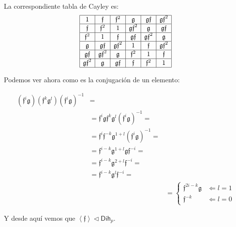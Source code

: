 \documentclass[12pt,a4paper,fleqn,spanish,final,openright]{extbook}
\theoremstyle{definition}
\theoremstyle{remark}
\begin{document}
La correspondiente tabla de Cayley es:
\begin{align*}
\begin{array}{|c|c|c|c|c|c|c|c|}
\hline
1&\mathfrak{f}&\mathfrak{f}^2&\mathfrak{g}&\mathfrak{gf}&\mathfrak{gf}^2\\
\hline
\mathfrak{f}&\mathfrak{f}^2&1&\mathfrak{gf}^2&\mathfrak{g}&\mathfrak{gf}\\
\hline
\mathfrak{f}^2&1&\mathfrak{f}&\mathfrak{gf}&\mathfrak{gf}^2&\mathfrak{g}\\
\hline
\mathfrak{g}&\mathfrak{gf}&\mathfrak{gf}^2&1&\mathfrak{f}&\mathfrak{gf}^2\\
\hline
\mathfrak{gf}&\mathfrak{gf}^2&\mathfrak{g}&\mathfrak{f}^2&1&\mathfrak{f}\\
\hline
\mathfrak{gf}^2&\mathfrak{g}&\mathfrak{gf}&\mathfrak{f}&\mathfrak{f}^2&1\\
\hline
\end{array}
\end{align*}

Podemos ver ahora como es la conjugación de un elemento:

\begin{align}
(\mathfrak{f}^i\mathfrak{g})(\mathfrak{f}^k\mathfrak{g}^l)(\mathfrak{f}^i\mathfrak{g})^{-1} &=&\\
&=\mathfrak{f}^i\mathfrak{g}\mathfrak{f}^k\mathfrak{g}^l(\mathfrak{f}^i\mathfrak{g})^{-1}=&\\
&=\mathfrak{f}^i\mathfrak{f}^{-k}\mathfrak{g}^{1+l}(\mathfrak{f}^i\mathfrak{g})^{-1}=&\\
&= \mathfrak{f}^{i-k}\mathfrak{g}^{1+l}\mathfrak{g} \mathfrak{f}^{-i} =& \\
&= \mathfrak{f}^{i-k}\mathfrak{g}^{2+l} \mathfrak{f}^{-i} =& \\
&= \mathfrak{f}^{i-k}\mathfrak{g}^{l} \mathfrak{f}^{-i} =& \\
&&=\begin{cases}
\mathfrak{f}^{2i-k} \mathfrak{g} &    \Leftarrow    l = 1\\
\mathfrak{f}^{-k} &    \Leftarrow    l = 0
\end{cases}
\end{align}

Y desde aquí vemos que $\left\langle \mathfrak f \right\rangle \lhd \mathsf{Dih}_{p}$.
\end{document}
